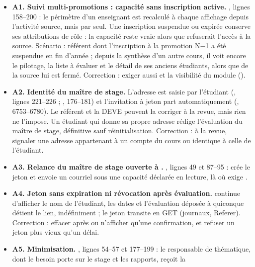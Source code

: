 \documentclass[11pt,a4paper]{article}
\newcommand{\grav}[1]{\textbf{\textcolor{#1}{\textbullet}}}
\newcommand{\maj}{\grav{orange}}
\newcommand{\mineure}{\grav{gray}}
\begin{document}
\begin{itemize}
  \item[\maj] \textbf{A1. Suivi multi-promotions : capacité sans inscription active.}
    , lignes 158--200 : le périmètre d'un enseignant est
    recalculé à chaque affichage depuis l'activité source, mais par  seul.
    Une inscription suspendue ou expirée conserve ses attributions de rôle : la capacité reste
    vraie alors que  refuserait l'accès à la source. Scénario : référent dont
    l'inscription à la promotion N$-$1 a été suspendue en fin d'année ; depuis la synthèse d'un
    autre cours, il voit encore le pilotage, la liste à évaluer et le détail de ses anciens
    étudiants, alors que  de la source lui est fermé. Correction : exiger aussi
     et la visibilité du module
    ().
  \item[\maj] \textbf{A2. Identité du maître de stage.} L'adresse  est saisie par
    l'étudiant (, lignes 221--226 ;
    , 176--181) et l'invitation à jeton part automatiquement
    (, 6753--6780). Le référent et la DEVE peuvent la corriger à la revue, mais
    rien ne l'impose. Un étudiant qui donne sa propre adresse rédige l'évaluation du maître de
    stage, définitive sauf réinitialisation. Correction : à la revue, signaler une adresse
    appartenant à un compte du cours ou identique à celle de l'étudiant.
  \item[\mineure] \textbf{A3. Relance du maître de stage ouverte à .}
    , lignes 49 et 87--95 :  crée le jeton et envoie un
    courriel sous une capacité déclarée en lecture, là où  exige
    .
  \item[\mineure] \textbf{A4. Jeton sans expiration ni révocation après évaluation.}
     continue d'afficher le nom de l'étudiant, les dates et l'évaluation
    déposée à quiconque détient le lien, indéfiniment ; le jeton transite en GET (journaux,
    Referer). Correction : effacer  après  ou
    n'afficher qu'une confirmation, et refuser un jeton plus vieux qu'un délai.
  \item[\mineure] \textbf{A5. Minimisation.} , lignes 54--57 et 177--199 : le
    responsable de thématique, dont le besoin porte sur le stage et les rapports, reçoit la

\end{itemize}
\end{document}
